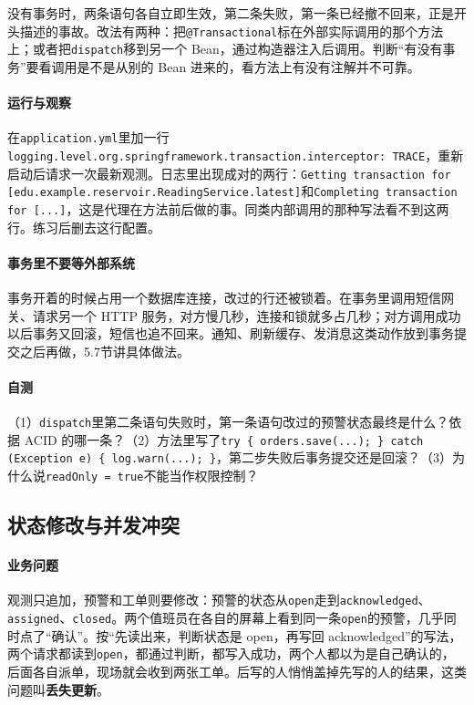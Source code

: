 没有事务时，两条语句各自立即生效，第二条失败，第一条已经撤不回来，正是开头描述的事故。改法有两种：把\texttt{@Transactional}标在外部实际调用的那个方法上；或者把\texttt{dispatch}移到另一个 Bean，通过构造器注入后调用。判断“有没有事务”要看调用是不是从别的 Bean 进来的，看方法上有没有注解并不可靠。

\paragraph{运行与观察}在\texttt{application.yml}里加一行\texttt{logging.level.}\allowbreak\texttt{org.springframework.}\allowbreak\texttt{transaction.}\allowbreak\texttt{interceptor:\ TRACE}，重新启动后请求一次最新观测。日志里出现成对的两行：\texttt{Getting transaction for}\allowbreak\texttt{ [edu.example.reservoir.}\allowbreak\texttt{ReadingService.latest]}和\texttt{Completing transaction}\allowbreak\texttt{ for [...]}，这是代理在方法前后做的事。同类内部调用的那种写法看不到这两行。练习后删去这行配置。

\paragraph{事务里不要等外部系统}事务开着的时候占用一个数据库连接，改过的行还被锁着。在事务里调用短信网关、请求另一个 HTTP 服务，对方慢几秒，连接和锁就多占几秒；对方调用成功以后事务又回滚，短信也追不回来。通知、刷新缓存、发消息这类动作放到事务提交之后再做，5.7节讲具体做法。

\paragraph{自测}（1）\texttt{dispatch}里第二条语句失败时，第一条语句改过的预警状态最终是什么？依据 ACID 的哪一条？（2）方法里写了\texttt{try \{ orders.save(...); \} catch (Exception e) \{ log.warn(...); \}}，第二步失败后事务提交还是回滚？（3）为什么说\texttt{readOnly = true}不能当作权限控制？

\subsection{状态修改与并发冲突}

\paragraph{业务问题}观测只追加，预警和工单则要修改：预警的状态从\texttt{open}走到\texttt{acknowledged}、\texttt{assigned}、\texttt{closed}。两个值班员在各自的屏幕上看到同一条\texttt{open}的预警，几乎同时点了“确认”。按“先读出来，判断状态是 open，再写回 acknowledged”的写法，两个请求都读到\texttt{open}，都通过判断，都写入成功，两个人都以为是自己确认的，后面各自派单，现场就会收到两张工单。后写的人悄悄盖掉先写的人的结果，这类问题叫\textbf{丢失更新}。

